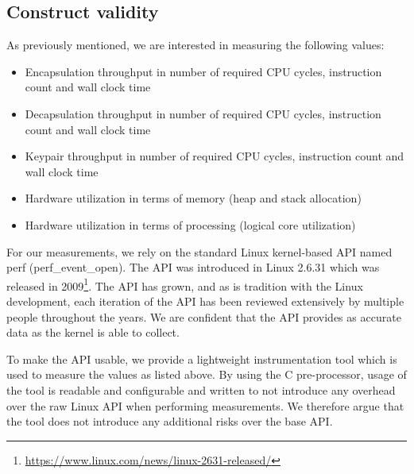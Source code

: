 \subsection{Construct validity}



As previously mentioned, we are interested in measuring the following values:

\begin{itemize}
    \item Encapsulation throughput in number of required CPU cycles, instruction count and wall clock time
    \item Decapsulation throughput in number of required CPU cycles, instruction count and wall clock time
    \item Keypair throughput in number of required CPU cycles, instruction count and wall clock time
    \item Hardware utilization in terms of memory (heap and stack allocation)
    \item Hardware utilization in terms of processing (logical core utilization)
\end{itemize}

For our measurements, we rely on the standard Linux kernel-based API named perf (perf\_event\_open). The API was introduced in Linux 2.6.31 which was released in 2009\footnote{\href{https://www.linux.com/news/linux-2631-released/}{https://www.linux.com/news/linux-2631-released/}}. The API has grown, and as is tradition with the Linux development, each iteration of the API has been reviewed extensively by multiple people throughout the years. We are confident that the API provides as accurate data as the kernel is able to collect.

To make the API usable, we provide a lightweight instrumentation tool which is used to measure the values as listed above. By using the C pre-processor, usage of the tool is readable and configurable and written to not introduce any overhead over the raw Linux API when performing measurements. We therefore argue that the tool does not introduce any additional risks over the base API.

